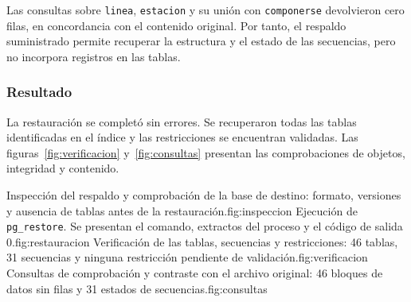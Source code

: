 Las consultas sobre \texttt{linea}, \texttt{estacion} y su unión con
\texttt{componerse} devolvieron cero filas, en concordancia con el contenido
original. Por tanto, el respaldo suministrado permite recuperar la
estructura y el estado de las secuencias, pero no incorpora registros
en las tablas.

\subsubsection{Resultado}
La restauración se completó sin errores. Se recuperaron todas las tablas
identificadas en el índice y las restricciones se encuentran validadas.
Las figuras~\ref{fig:verificacion} y~\ref{fig:consultas} presentan las
comprobaciones de objetos, integridad y contenido.

\clearpage
\begin{landscape}
{Inspección del respaldo y comprobación de la base de destino: formato,
versiones y ausencia de tablas antes de la restauración.}{fig:inspeccion}
{Ejecución de \texttt{pg\_restore}. Se presentan el comando, extractos del
proceso y el código de salida 0.}{fig:restauracion}
{Verificación de las tablas, secuencias y restricciones: 46 tablas,
31 secuencias y ninguna restricción pendiente de validación.}{fig:verificacion}
{Consultas de comprobación y contraste con el archivo original:
46 bloques de datos sin filas y 31 estados de secuencias.}{fig:consultas}
\end{landscape}
